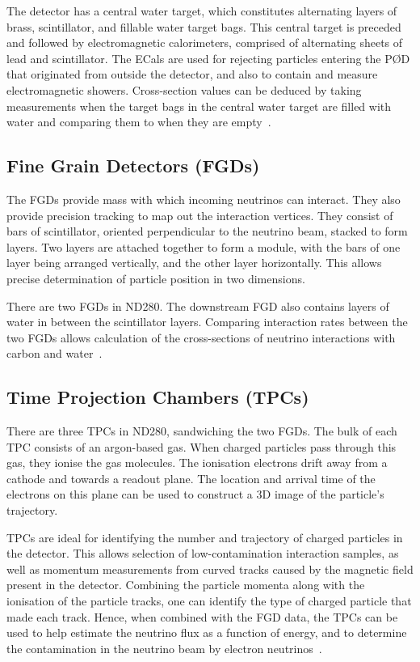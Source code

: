 \documentclass[aps,pra,12pt,notitlepage,tightenlines]{revtex4-1}
\begin{document}
The detector has a central water target, which constitutes alternating layers of brass, scintillator, and fillable water target bags. This central target is preceded and followed by electromagnetic calorimeters, comprised of alternating sheets of lead and scintillator. The ECals are used for rejecting particles entering the P\O D that originated from outside the detector, and also to contain and measure electromagnetic showers. Cross-section values can be deduced by taking measurements when the target bags in the central water target are filled with water and comparing them to when they are empty~\cite{ABE2011106, Assylbekov:2011sh}.

\subsection{Fine Grain Detectors (FGDs)}
The FGDs provide mass with which incoming neutrinos can interact. They also provide precision tracking to map out the interaction vertices. They consist of bars of scintillator, oriented perpendicular to the neutrino beam, stacked to form layers. Two layers are attached together to form a module, with the bars of one layer being arranged vertically, and the other layer horizontally. This allows precise determination of particle position in two dimensions.

There are two FGDs in ND280. The downstream FGD also contains layers of water in between the scintillator layers. Comparing interaction rates between the two FGDs allows calculation of the cross-sections of neutrino interactions with carbon and water~\cite{ABE2011106, Amaudruz:2012agx}.

\subsection{Time Projection Chambers (TPCs)}
There are three TPCs in ND280, sandwiching the two FGDs. The bulk of each TPC consists of an argon-based gas. When charged particles pass through this gas, they ionise the gas molecules. The ionisation electrons drift away from a cathode and towards a readout plane. The location and arrival time of the electrons on this plane can be used to construct a 3D image of the particle's trajectory.

TPCs are ideal for identifying the number and trajectory of charged particles in the detector. This allows selection of low-contamination interaction samples, as well as momentum measurements from curved tracks caused by the magnetic field present in the detector. Combining the particle momenta along with the ionisation of the particle tracks, one can identify the type of charged particle that made each track. Hence, when combined with the FGD data, the TPCs can be used to help estimate the neutrino flux as a function of energy, and to determine the contamination in the neutrino beam by electron neutrinos~\cite{ABE2011106, Abgrall:2010hi}.
\end{document}
